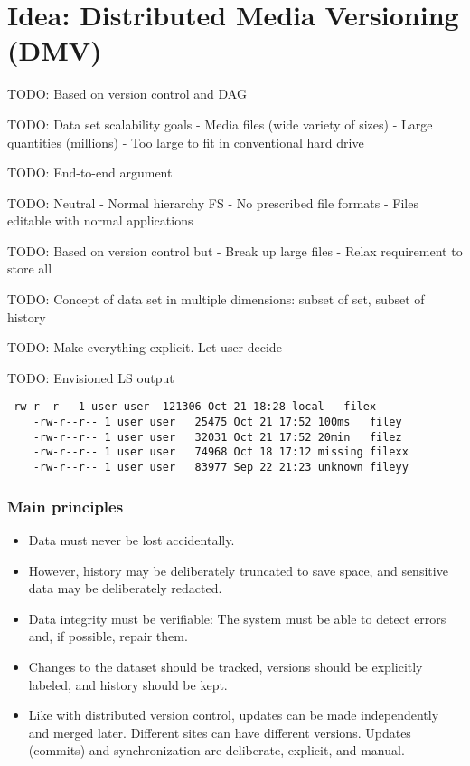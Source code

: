 \chapter{Idea: Distributed Media Versioning (DMV)}

TODO: Based on version control and DAG

TODO: Data set scalability goals
    - Media files (wide variety of sizes)
    - Large quantities (millions)
    - Too large to fit in conventional hard drive

TODO: End-to-end argument

TODO: Neutral
    - Normal hierarchy FS
    - No prescribed file formats
    - Files editable with normal applications

TODO: Based on version control but
    - Break up large files
    - Relax requirement to store all

TODO: Concept of data set in multiple dimensions: subset of set, subset of
history

TODO: Make everything explicit. Let user decide


TODO: Envisioned LS output

\begin{lstlisting}[caption=Example ls output]
    -rw-r--r-- 1 user user  121306 Oct 21 18:28 local   filex
    -rw-r--r-- 1 user user   25475 Oct 21 17:52 100ms   filey
    -rw-r--r-- 1 user user   32031 Oct 21 17:52 20min   filez
    -rw-r--r-- 1 user user   74968 Oct 18 17:12 missing filexx
    -rw-r--r-- 1 user user   83977 Sep 22 21:23 unknown fileyy
\end{lstlisting}



\subsection{Main principles}

\begin{itemize}

  \item Data must never be lost accidentally.

  \item However, history may be deliberately truncated to save space, and
    sensitive data may be deliberately redacted.

  \item Data integrity must be verifiable: The system must be able to detect
    errors and, if possible, repair them.

  \item Changes to the dataset should be tracked, versions should be explicitly
    labeled, and history should be kept.

  \item Like with distributed version control, updates can be made independently
    and merged later. Different sites can have different versions. Updates
    (commits) and synchronization are deliberate, explicit, and manual.

\end{itemize}

